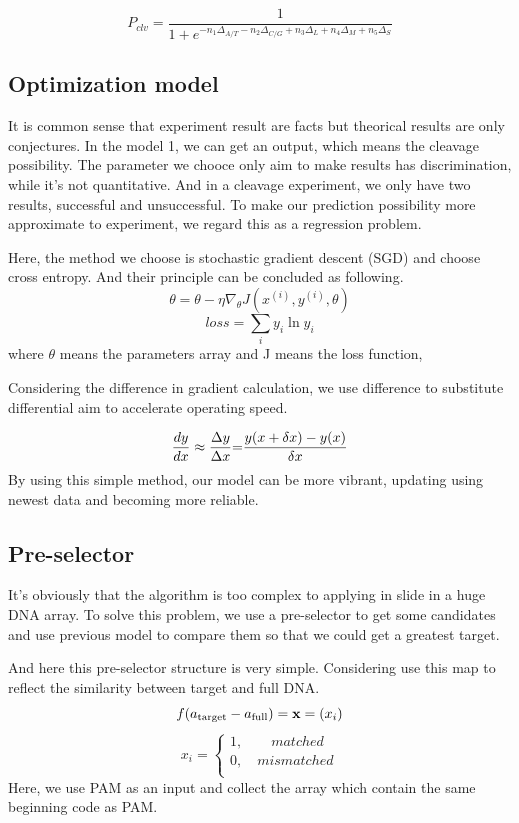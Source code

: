 \documentclass[a4paper,10pt]{article}
\begin{document}
	$$
	P_{clv}=\frac{1}{1+e^{-n_1\Delta_{A/T}-n_2\Delta_{C/G}+n_3\Delta_{L}+n_4\Delta_{M}+n_5\Delta_{S}}}
	$$
	\subsection{Optimization model}
	It is common sense that experiment result are facts but theorical results are only conjectures. In the model 1, we can get an output, which means the cleavage possibility. The parameter we chooce only aim to make results has discrimination, while it’s not quantitative. And in a cleavage experiment, we only have two results, successful and unsuccessful. To make our prediction possibility more approximate to experiment, we regard this as a regression problem.\par
	Here, the method we choose is stochastic gradient descent (SGD) and choose cross entropy. And their principle can be concluded as following.
	\[\theta  = \theta  - \eta {\nabla _\theta }J({x^{(i)}},{y^{(i)}},\theta )\]
	\[loss = \sum\limits_i {{y_i}\ln {y_i}}\]
	where $\theta$ means the parameters array and J means the loss function, \par
	Considering the difference in gradient calculation, we use difference to substitute differential aim to accelerate operating speed.\par
	\[\frac{{dy}}{{dx}} \approx \frac{{\Delta y}}{{\Delta x}}{\rm{ = }}\frac{{y(x + \delta x) - y(x)}}{{\delta x}}\]
	By using this simple method, our model can be more vibrant, updating using newest data and becoming more reliable.
	\subsection{Pre-selector}
	It’s obviously that the algorithm is too complex to applying in slide in a huge DNA array. To solve this problem, we use a pre-selector to get some candidates and use previous model to compare them so that we could get a greatest target.\par
	And here this pre-selector structure is very simple.
	Considering use this map to reflect the similarity between target and full DNA.
	\[f({a_{{\rm{target}}}} - {a_{{\rm{full}}}}) = {\bf{x}} = ({x_i})\]
	\[{x_i} = \left\{ {\begin{array}{*{20}{c}}
		{1,\quad \quad matched}  \\
		{0,\quad mismatched}  \\
		\end{array}} \right.\]
	Here, we use PAM as an input and collect the array which contain the same beginning code as PAM.
\end{document}
